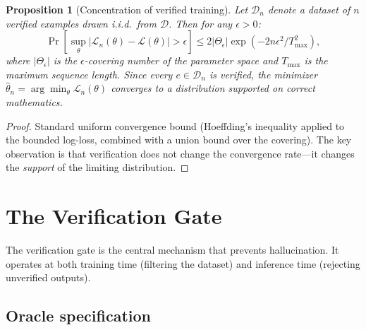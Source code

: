 \documentclass[11pt,a4paper]{article}
\newtheorem{proposition}[theorem]{Proposition}
\newcommand{\cD}{\mathcal{D}}
\newcommand{\cL}{\mathcal{L}}
\newcommand{\abs}[1]{\lvert #1 \rvert}
\begin{document}
\begin{proposition}[Concentration of verified training]\label{prop:concentration}
Let $\cD_n$ denote a dataset of $n$ verified examples
drawn i.i.d.\ from $\cD$.
Then for any $\epsilon > 0$:
\[
\Pr\!\left[\sup_\theta \abs{\cL_n(\theta) - \cL(\theta)}
  > \epsilon\right]
\leq 2|\Theta_\epsilon| \exp(-2n\epsilon^2 / T_{\max}^2),
\]
where $|\Theta_\epsilon|$ is the $\epsilon$-covering number
of the parameter space and $T_{\max}$ is the maximum
sequence length.
Since every $e \in \cD_n$ is verified, the minimizer
$\hat\theta_n = \arg\min_\theta \cL_n(\theta)$ converges
to a distribution supported on correct mathematics.
\end{proposition}

\begin{proof}
Standard uniform convergence bound
(Hoeffding's inequality applied to the bounded log-loss,
combined with a union bound over the covering).
The key observation is that verification does not change
the convergence rate---it changes the \emph{support}
of the limiting distribution.
\end{proof}

\section{The Verification Gate}\label{sec:gate}

The verification gate is the central mechanism that prevents
hallucination.
It operates at both training time (filtering the dataset)
and inference time (rejecting unverified outputs).

\subsection{Oracle specification}
\end{document}
